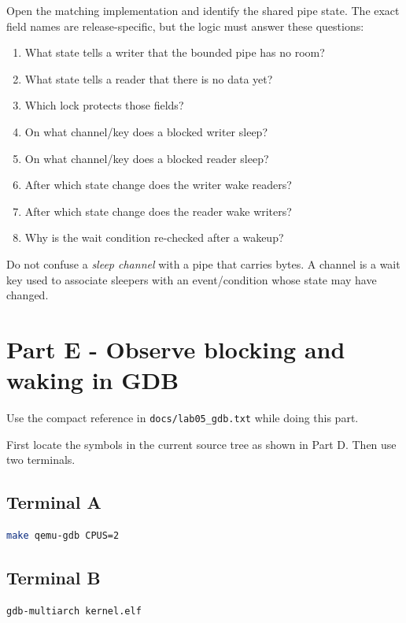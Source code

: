 \documentclass[11pt,a4paper]{article}
\newcommand{\file}[1]{\texttt{#1}}
\begin{document}
Open the matching implementation and identify the shared pipe state. The exact field names are release-specific, but the logic must answer these questions:

\begin{enumerate}[leftmargin=7mm]
\item What state tells a writer that the bounded pipe has no room?
\item What state tells a reader that there is no data yet?
\item Which lock protects those fields?
\item On what channel/key does a blocked writer sleep?
\item On what channel/key does a blocked reader sleep?
\item After which state change does the writer wake readers?
\item After which state change does the reader wake writers?
\item Why is the wait condition re-checked after a wakeup?
\end{enumerate}

Do not confuse a \emph{sleep channel} with a pipe that carries bytes. A channel is a wait key used to associate sleepers with an event/condition whose state may have changed.

\section{Part E - Observe blocking and waking in GDB}

Use the compact reference in \file{docs/lab05\_gdb.txt} while doing this part.

First locate the symbols in the current source tree as shown in Part D. Then use two terminals.

\subsection*{Terminal A}

\begin{lstlisting}[language=bash]
make qemu-gdb CPUS=2
\end{lstlisting}

\subsection*{Terminal B}

\begin{lstlisting}[language=bash]
gdb-multiarch kernel.elf
\end{lstlisting}
\end{document}
